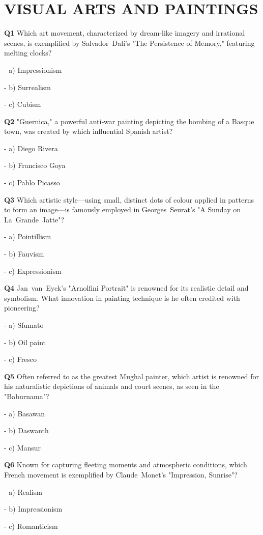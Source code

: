 \section{VISUAL ARTS AND PAINTINGS}

\textbf{Q1} Which art movement, characterized by dream‑like imagery and irrational scenes, is exemplified by Salvador Dalí's "The Persistence of Memory," featuring melting clocks?\par
\quad - a) Impressionism\par
\quad - b) Surrealism\par
\quad - c) Cubism\par

\textbf{Q2} "Guernica," a powerful anti‑war painting depicting the bombing of a Basque town, was created by which influential Spanish artist?\par
\quad - a) Diego Rivera\par
\quad - b) Francisco Goya\par
\quad - c) Pablo Picasso\par

\textbf{Q3} Which artistic style—using small, distinct dots of colour applied in patterns to form an image—is famously employed in Georges Seurat's "A Sunday on La Grande Jatte"?\par
\quad - a) Pointillism\par
\quad - b) Fauvism\par
\quad - c) Expressionism\par

\textbf{Q4} Jan van Eyck's "Arnolfini Portrait" is renowned for its realistic detail and symbolism. What innovation in painting technique is he often credited with pioneering?\par
\quad - a) Sfumato\par
\quad - b) Oil paint\par
\quad - c) Fresco\par

\textbf{Q5} Often referred to as the greatest Mughal painter, which artist is renowned for his naturalistic depictions of animals and court scenes, as seen in the "Baburnama"?\par
\quad - a) Basawan\par
\quad - b) Daswanth\par
\quad - c) Mansur\par

\textbf{Q6} Known for capturing fleeting moments and atmospheric conditions, which French movement is exemplified by Claude Monet's "Impression, Sunrise"?\par
\quad - a) Realism\par
\quad - b) Impressionism\par
\quad - c) Romanticism\par

